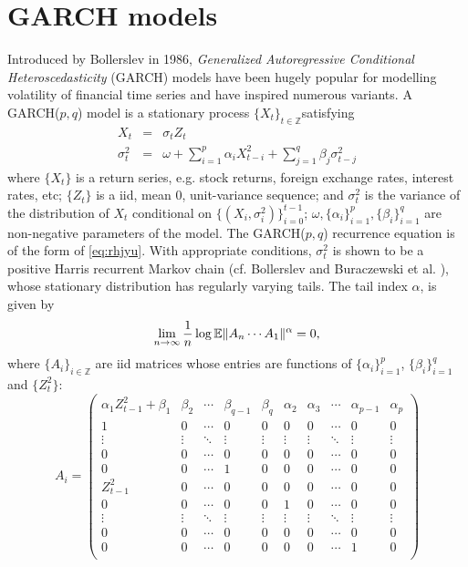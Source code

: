 \section{GARCH models}
Introduced by Bollerslev \cite{bollerslev:1986} in 1986,
{\em Generalized Autoregressive Conditional Heteroscedasticity}
(GARCH) models have been hugely popular for modelling volatility of
financial time series and have inspired numerous variants.
A GARCH($p, q$) model is a stationary process
$\{X_t\}_{t \in \mathbb Z}$satisfying
\begin{eqnarray*}
  X_t &=& \sigma_t Z_t \\
  \sigma_t^2 &=& \omega + \sum_{i=1}^p \alpha_i X_{t-i}^2 +
  \sum_{j=1}^q \beta_j \sigma_{t-j}^2
\end{eqnarray*}
where $\{X_t\}$ is a return series, e.g. stock returns, foreign exchange
rates, interest rates, etc; $\{Z_t\}$ is a iid, mean 0, unit-variance
sequence; and $\sigma_t^2$ is the variance of the
distribution of $X_t$ conditional on $\{(X_i,
\sigma_i^2)\}_{i=0}^{t-1}$; $\omega, \{\alpha_i\}_{i=1}^p,
\{\beta_i\}_{i=1}^q$ are non-negative parameters of the
model. The GARCH($p,q$) recurrence equation is of the form of
\eqref{eq:rhjyu}. With appropriate conditions, $\sigma_t^2$ is
shown to be a positive Harris recurrent Markov chain (cf. Bollerslev
\cite{bollerslev:1986} and Buraczewski et al.
\cite{buraczewski:damek:mikosch:2016}), whose stationary distribution
has regularly varying tails. The tail index $\alpha$, is given by
\begin{equation}
  \label{eq:grgbg}
  \lim_{n \to \infty} {1 \over n}\log\mathbb{E}\|A_n \cdots A_1\|^\alpha = 0,
\end{equation}
where $\{A_i\}_{i \in \mathbb Z}$ are iid matrices whose entries are
functions of $\{\alpha_i\}_{i=1}^p$, $\{\beta_i\}_{i=1}^q$ and
$\{Z_t^2\}$:
\[
A_i =
\begin{pmatrix}
  \alpha_1 Z_{t-1}^2 + \beta_1 & \beta_2 & \cdots &
  \beta_{q-1} & \beta_q & \alpha_2 & \alpha_3 &
  \cdots & \alpha_{p-1} & \alpha_p\\
  1 & 0 & \cdots & 
  0 & 0 & 0 & 0 & \cdots & 0 & 0 \\
  \vdots & \vdots & \ddots & 
  \vdots & \vdots & \vdots & \vdots &
  \ddots & \vdots & \vdots \\
  0 & 0 & \cdots &
  0 & 0 & 0 & 0 & \cdots & 0 & 0 \\
  0 & 0 & \cdots &
  1 & 0 & 0 & 0 & \cdots & 0 & 0 \\
  Z_{t-1}^2 & 0 & \cdots &
  0 & 0 & 0 & 0 & \cdots & 0 & 0 \\
  0 & 0 & \cdots &
  0 & 0 & 1 & 0 & \cdots & 0 & 0 \\
  \vdots & \vdots & \ddots &
  \vdots & \vdots & \vdots & \vdots &
  \ddots & \vdots & \vdots \\
  0 & 0 & \cdots &
  0 & 0 & 0 & 0 & \cdots & 0 & 0 \\    
  0 & 0 & \cdots &
  0 & 0 & 0 & 0 & \cdots & 1 & 0 \\    
\end{pmatrix}
\]
